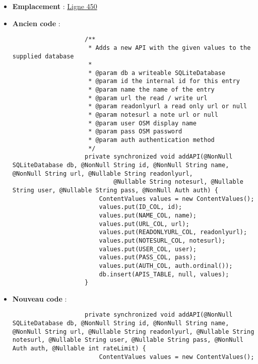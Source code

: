 \begin{enumerate}
\begin{itemize}
              \item \textbf{Emplacement} :
                    \href{https://github.com/MarcusWolschon/osmeditor4android/blob/127fb689ad42c77558e4512e14de754e0561cd27/src/main/java/de/blau/android/prefs/AdvancedPrefDatabase.java#L450}{Ligne 450}
              \item \textbf{Ancien code} :
                    \begin{verbatim}
                    /**
                     * Adds a new API with the given values to the supplied database
                     *
                     * @param db a writeable SQLiteDatabase
                     * @param id the internal id for this entry
                     * @param name the name of the entry
                     * @param url the read / write url
                     * @param readonlyurl a read only url or null
                     * @param notesurl a note url or null
                     * @param user OSM display name
                     * @param pass OSM password
                     * @param auth authentication method
                     */
                    private synchronized void addAPI(@NonNull SQLiteDatabase db, @NonNull String id, @NonNull String name, @NonNull String url, @Nullable String readonlyurl,
                            @Nullable String notesurl, @Nullable String user, @Nullable String pass, @NonNull Auth auth) {
                        ContentValues values = new ContentValues();
                        values.put(ID_COL, id);
                        values.put(NAME_COL, name);
                        values.put(URL_COL, url);
                        values.put(READONLYURL_COL, readonlyurl);
                        values.put(NOTESURL_COL, notesurl);
                        values.put(USER_COL, user);
                        values.put(PASS_COL, pass);
                        values.put(AUTH_COL, auth.ordinal());
                        db.insert(APIS_TABLE, null, values);
                    }
                    \end{verbatim}
              \item \textbf{Nouveau code} :
                    \begin{verbatim}
                    private synchronized void addAPI(@NonNull SQLiteDatabase db, @NonNull String id, @NonNull String name, @NonNull String url, @Nullable String readonlyurl, @Nullable String notesurl, @Nullable String user, @Nullable String pass, @NonNull Auth auth, @Nullable int rateLimit) {
                        ContentValues values = new ContentValues();

\end{verbatim}
\end{itemize}
\end{enumerate}
